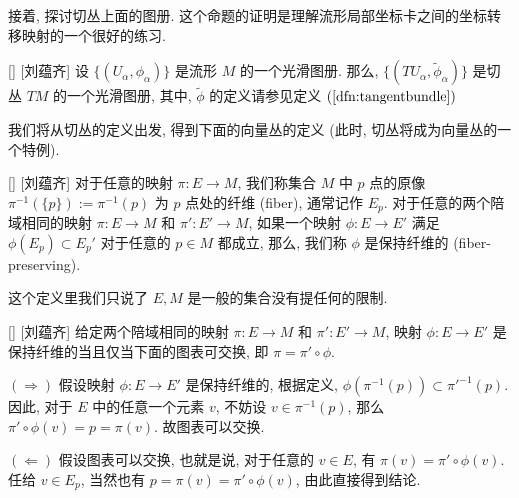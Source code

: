 \documentclass[UTF8]{ctexart}
\begin{document}
        接着, 探讨切丛上面的图册. 这个命题的证明是理解流形局部坐标卡之间的坐标转移映射的一个很好的练习. 

        \begin{ppt}
            []
            {}
            []
            [刘蕴齐]
            设 \(\{(U_{\alpha}, \phi_{\alpha})\}\) 是流形 \(M\) 的一个光滑图册. 那么,  \(\{(T U_{\alpha}, \tilde{\phi}_{\alpha})\}\) 是切丛 \(TM\) 的一个光滑图册, 其中,  \(\tilde{\phi}\) 的定义请参见定义 \((\ref{dfn:tangentbundle})\) 
        \end{ppt}

        我们将从切丛的定义出发, 得到下面的向量丛的定义 (此时, 切丛将成为向量丛的一个特例). 

        \begin{dfn}
            []
            {}
            []
            [刘蕴齐]
            对于任意的映射 \(\pi: E \to M\), 我们称集合 \(M\) 中 \(p\) 点的原像 \(\pi^{-1} (\{p\}):= \pi^{-1}(p)\) 为 \(p\) 点处的纤维 (fiber), 通常记作 \(E_p\). 对于任意的两个陪域相同的映射 \(\pi: E \to M\) 和 \(\pi': E' \to M\), 如果一个映射 \(\phi: E \to E'\) 满足 \(\phi(E_p) \subset E_p '\) 对于任意的 \(p \in M\) 都成立, 那么, 我们称 \(\phi\) 是保持纤维的 (fiber-preserving). 
        \end{dfn}

        \begin{rmk}
            []
            这个定义里我们只说了 \(E, M\) 是一般的集合没有提任何的限制. 
        \end{rmk}

        \begin{ppt}
            []
            {}
            []
            [刘蕴齐]
            给定两个陪域相同的映射 \(\pi: E \to M\) 和 \(\pi': E' \to M\), 映射 \(\phi: E \to E'\) 是保持纤维的当且仅当下面的图表可交换, 即 \(\pi = \pi' \circ \phi\). 
        \end{ppt}

        \begin{prf}
             \((\Rightarrow)\)  假设映射 \(\phi: E \to E'\) 是保持纤维的, 根据定义,  \(\phi(\pi^{-1}(p)) \subset \pi'^{-1}(p)\). 因此, 对于 \(E\) 中的任意一个元素 \(v\), 不妨设 \(v \in \pi^{-1}(p)\), 那么 \(\pi' \circ \phi (v) = p = \pi(v)\). 故图表可以交换. 
            
             \((\Leftarrow)\)  假设图表可以交换, 也就是说, 对于任意的 \(v \in  E\), 有 \(\pi(v) = \pi' \circ \phi(v)\). 任给 \(v \in E_p\), 当然也有 \(p = \pi(v) = \pi' \circ \phi(v)\), 由此直接得到结论. 
        \end{prf}
\end{document}

